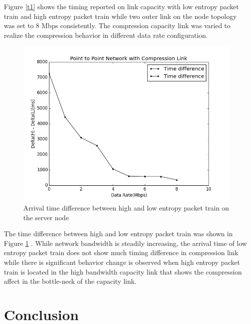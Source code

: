 \documentclass[sigconf]{acmart}
\begin{document}
Figure \ref{t1} shows the timing reported on link capacity with low entropy packet train and high entropy packet train while two outer link on the node topology was set to 8 Mbps consistently. The compression capacity link was varied to realize the compression behavior in different data rate configuration. 

 \begin{figure}[h]
  \centering
  \includegraphics[width=\linewidth]{timing2}
  \caption{Arrival time difference between high and low entropy packet train on the server node }
  \label{t2}
\end{figure} 

The time difference between high and low entropy packet train was shown in Figure \ref{t2} . While network bandwidth is steadily increasing, the arrival time of low entropy packet train does not show much timing difference in compression link while there is significant behavior change is observed when high entropy packet train is located in the high bandwidth capacity link that shows the compression affect in the bottle-neck of the capacity link. 

\section{Conclusion}







\end{document}
